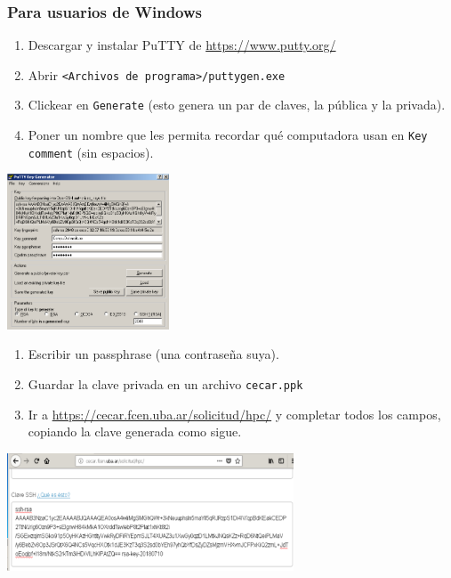 \documentclass[handout]{beamer}
\begin{document}
\begin{frame}
\frametitle{Para usuarios de Windows}
\begin{enumerate}
  \item Descargar y instalar PuTTY de \url{https://www.putty.org/}
  \item Abrir \Verb=<Archivos de programa>/puttygen.exe=
  \item Clickear en \Verb=Generate= (esto genera un par de claves, la pública y la privada).
  \item Poner un nombre que les permita recordar qué computadora usan en \Verb=Key comment= (sin espacios).
\end{enumerate}
  \begin{center}
  \includegraphics[width=13em]{./puttygen}
  \end{center} 
\end{frame}

\begin{frame}
\begin{enumerate}
  \item Escribir un passphrase (una contraseña suya).
  \item Guardar la clave privada en un archivo \Verb=cecar.ppk=
  \item Ir a \url{https://cecar.fcen.uba.ar/solicitud/hpc/} y completar todos los campos, copiando la clave generada como sigue.
\end{enumerate}
\begin{center}
  \includegraphics[width=23em]{./ssh-web-cecar}
  \end{center} 
\end{frame}
\end{document}
